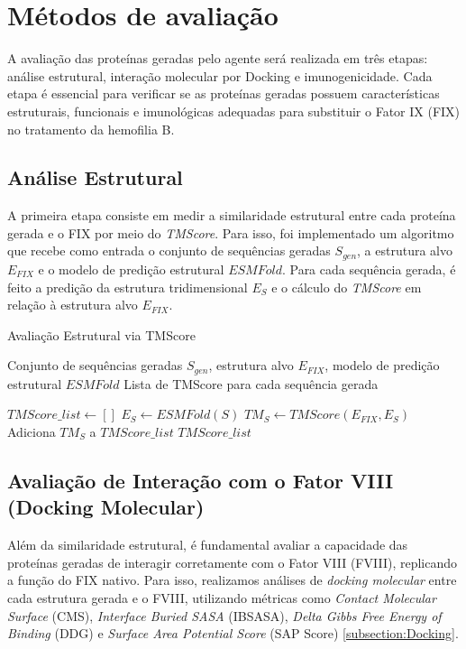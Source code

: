 \section{Métodos de avaliação}

A avaliação das proteínas geradas pelo agente será realizada em três etapas: 
análise estrutural, interação molecular por Docking e imunogenicidade. 
Cada etapa é essencial para verificar se as proteínas geradas possuem características estruturais, 
funcionais e imunológicas adequadas para substituir o Fator IX (FIX) no tratamento da hemofilia B.  

\subsection{Análise Estrutural}

A primeira etapa consiste em medir a similaridade estrutural entre cada proteína gerada
e o FIX por meio do \textit{TMScore}. 
Para isso, foi implementado um algoritmo que recebe como entrada o conjunto de sequências geradas $S_{gen}$,
a estrutura alvo $E_{FIX}$ e o modelo de predição estrutural $ESMFold$. 
Para cada sequência gerada, é feito a predição da estrutura tridimensional $E_S$ e o cálculo do \textit{TMScore} em
relação à estrutura alvo $E_{FIX}$.

\begin{algorithm}
  \caption{Avaliação Estrutural via TMScore}
  \label{alg:evaluation_tmscore}
  \begin{algorithmic}[1]
  \Require Conjunto de sequências geradas $S_{gen}$, 
  \State         estrutura alvo $E_{FIX}$,
  \State         modelo de predição estrutural $ESMFold$
  \Ensure Lista de TMScore para cada sequência gerada

  \State $TMScore\_list \gets []$
      \State $E_S \gets ESMFold(S)$
      \State $TM_S \gets TMScore(E_{FIX}, E_S)$
      \State Adiciona $TM_S$ a $TMScore\_list$
  \EndFor
  \State \Return $TMScore\_list$
  \end{algorithmic}
\end{algorithm}

\subsection{Avaliação de Interação com o Fator VIII (Docking Molecular)}

Além da similaridade estrutural, é fundamental avaliar a capacidade das proteínas geradas 
de interagir corretamente com o Fator VIII (FVIII), replicando a função do FIX nativo. 
Para isso, realizamos análises de \textit{docking molecular} entre cada estrutura gerada e o FVIII,
utilizando métricas como \textit{Contact Molecular Surface} (CMS), \textit{Interface Buried SASA} (IBSASA), 
\textit{Delta Gibbs Free Energy of Binding} (DDG) e \textit{Surface Area Potential Score} (SAP Score) \ref{subsection:Docking}.

